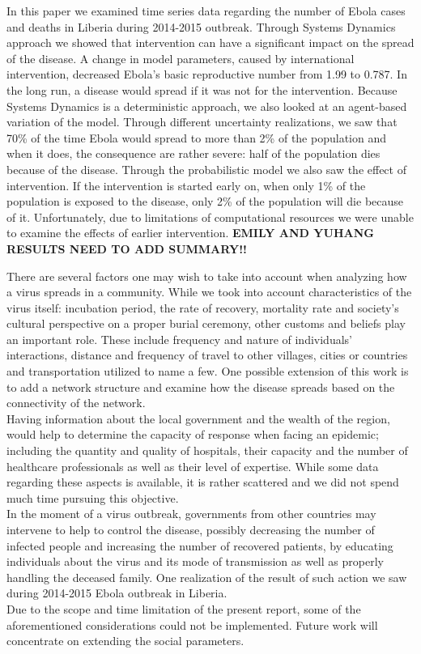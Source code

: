 In this paper we examined time series data  regarding the number of Ebola cases and deaths in Liberia during 2014-2015 outbreak. Through Systems Dynamics approach we showed that intervention can have a significant impact on the spread of the disease. A change in model parameters, caused by international intervention, decreased Ebola's basic reproductive number from 1.99 to 0.787. In the long run, a disease would spread if it was not for the intervention. Because Systems Dynamics is a deterministic approach, we also looked at an agent-based variation of the model. Through different uncertainty realizations, we saw that  70\% of the time Ebola would spread to more than 2\% of the population and when it does, the consequence are rather severe: half of the population dies because of the disease. Through the probabilistic model we also saw the effect of intervention. If the intervention is started early on, when only 1\% of the population is exposed to the disease, only 2\% of the population will die because of it. Unfortunately, due to limitations of computational resources we were unable to examine the effects of earlier intervention. \textbf{EMILY AND YUHANG RESULTS
NEED TO ADD SUMMARY!!}

There are several factors one may wish to take into account when analyzing how a virus spreads in a community. While we took into account characteristics of the virus itself: incubation period, the rate of recovery, mortality rate and society's cultural perspective on a proper burial ceremony, other customs and beliefs play an important role. These include frequency and nature of individuals' interactions, distance and frequency of travel to other villages, cities or countries and transportation utilized to name a few. One possible extension of this work is to add a network structure and examine how the disease spreads based on the connectivity of the network.\\

Having information about the local government and the wealth of the region, would help to determine the capacity of response when facing an epidemic; including the quantity and quality of hospitals, their capacity and the number of healthcare professionals as well as 
their level of  expertise. While some data regarding these aspects is available, it is rather scattered and we did not spend much time pursuing this objective. \\

In the moment of a virus outbreak, governments from other countries may intervene to help to control the disease, possibly decreasing the number of infected people and increasing the number of recovered patients, by educating individuals about the virus and its mode of transmission as well as properly handling the deceased family. One realization of the result of such action we saw during 2014-2015 Ebola outbreak in Liberia.  \\

Due to the scope and time limitation of the present report, some of the aforementioned considerations could not be implemented. Future work will concentrate on extending the social parameters. 

